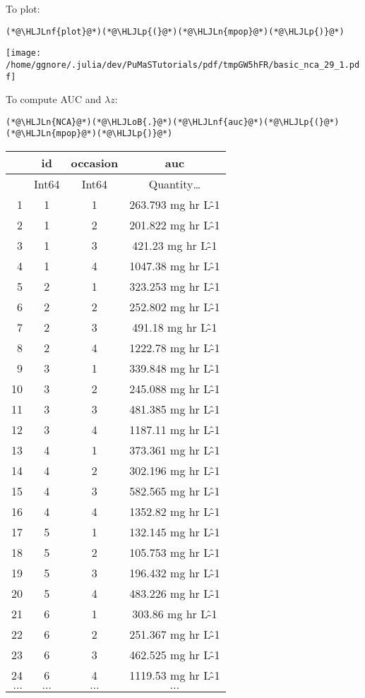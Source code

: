 \documentclass[12pt,a4paper]{article}
\newcommand{\HLJLn}[1]{#1}
\newcommand{\HLJLnf}[1]{\textcolor[RGB]{66,102,213}{#1}}
\newcommand{\HLJLoB}[1]{\textcolor[RGB]{102,102,102}{\textbf{#1}}}
\newcommand{\HLJLp}[1]{#1}
\begin{document}
To plot:


\begin{lstlisting}
(*@\HLJLnf{plot}@*)(*@\HLJLp{(}@*)(*@\HLJLn{mpop}@*)(*@\HLJLp{)}@*)
\end{lstlisting}

\texttt{[image: /home/ggnore/.julia/dev/PuMaSTutorials/pdf/tmpGW5hFR/basic\_nca\_29\_1.pdf]}

To compute AUC and $\lambda z$:


\begin{lstlisting}
(*@\HLJLn{NCA}@*)(*@\HLJLoB{.}@*)(*@\HLJLnf{auc}@*)(*@\HLJLp{(}@*)(*@\HLJLn{mpop}@*)(*@\HLJLp{)}@*)
\end{lstlisting}


\begin{tabular}{r|ccc}
	& id & occasion & auc\\
	\hline
	& Int64 & Int64 & Quantity…\\
	\hline
	1 & 1 & 1 & 263.793 mg hr L\^-1 \\
	2 & 1 & 2 & 201.822 mg hr L\^-1 \\
	3 & 1 & 3 & 421.23 mg hr L\^-1 \\
	4 & 1 & 4 & 1047.38 mg hr L\^-1 \\
	5 & 2 & 1 & 323.253 mg hr L\^-1 \\
	6 & 2 & 2 & 252.802 mg hr L\^-1 \\
	7 & 2 & 3 & 491.18 mg hr L\^-1 \\
	8 & 2 & 4 & 1222.78 mg hr L\^-1 \\
	9 & 3 & 1 & 339.848 mg hr L\^-1 \\
	10 & 3 & 2 & 245.088 mg hr L\^-1 \\
	11 & 3 & 3 & 481.385 mg hr L\^-1 \\
	12 & 3 & 4 & 1187.11 mg hr L\^-1 \\
	13 & 4 & 1 & 373.361 mg hr L\^-1 \\
	14 & 4 & 2 & 302.196 mg hr L\^-1 \\
	15 & 4 & 3 & 582.565 mg hr L\^-1 \\
	16 & 4 & 4 & 1352.82 mg hr L\^-1 \\
	17 & 5 & 1 & 132.145 mg hr L\^-1 \\
	18 & 5 & 2 & 105.753 mg hr L\^-1 \\
	19 & 5 & 3 & 196.432 mg hr L\^-1 \\
	20 & 5 & 4 & 483.226 mg hr L\^-1 \\
	21 & 6 & 1 & 303.86 mg hr L\^-1 \\
	22 & 6 & 2 & 251.367 mg hr L\^-1 \\
	23 & 6 & 3 & 462.525 mg hr L\^-1 \\
	24 & 6 & 4 & 1119.53 mg hr L\^-1 \\
	$\dots$ & $\dots$ & $\dots$ & $\dots$ \\
\end{tabular}
\end{document}
